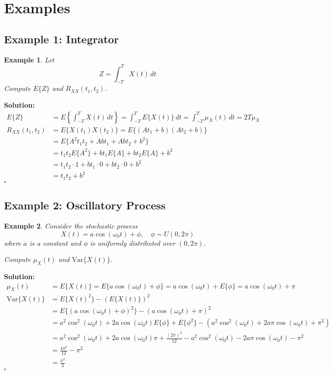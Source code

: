 \documentclass[12pt]{article}
\newtheorem{example}{Example}
\newenvironment{solution}{\noindent\textbf{Solution:}}{\hfill$\square$}
\begin{document}
\section{Examples}

\subsection{Example 1: Integrator}
\begin{example}
Let
\[
Z = \int_{-T}^{T} X(t) \, dt
\]
Compute \( E\{Z\} \) and \( R_{XX}(t_1, t_2) \).
\end{example}
\begin{solution}
\begin{align*}
E\{Z\} &= E\left\{\int_{-T}^{T} X(t) \, dt\right\} = \int_{-T}^{T} E\{X(t)\} \, dt = \int_{-T}^{T} \mu_X(t) \, dt = 2T \mu_X \\
R_{XX}(t_1, t_2) &= E\{X(t_1) X(t_2)\} = E\{(A t_1 + b)(A t_2 + b)\} \\
&= E\{A^2 t_1 t_2 + A b t_1 + A b t_2 + b^2\} \\
&= t_1 t_2 E\{A^2\} + b t_1 E\{A\} + b t_2 E\{A\} + b^2 \\
&= t_1 t_2 \cdot 1 + b t_1 \cdot 0 + b t_2 \cdot 0 + b^2 \\
&= t_1 t_2 + b^2
\end{align*}
\end{solution}

\subsection{Example 2: Oscillatory Process}
\begin{example}
Consider the stochastic process
\[
X(t) = a \cos(\omega_0 t) + \phi, \quad \phi \sim U(0, 2\pi)
\]
where \( a \) is a constant and \( \phi \) is uniformly distributed over \( (0, 2\pi) \).

Compute \( \mu_X(t) \) and \( \text{Var}\{X(t)\} \).
\end{example}
\begin{solution}
\begin{align*}
\mu_X(t) &= E\{X(t)\} = E\{a \cos(\omega_0 t) + \phi\} = a \cos(\omega_0 t) + E\{\phi\} = a \cos(\omega_0 t) + \pi \\
\text{Var}\{X(t)\} &= E\{X(t)^2\} - (E\{X(t)\})^2 \\
&= E\{(a \cos(\omega_0 t) + \phi)^2\} - (a \cos(\omega_0 t) + \pi)^2 \\
&= a^2 \cos^2(\omega_0 t) + 2a \cos(\omega_0 t) E\{\phi\} + E\{\phi^2\} - (a^2 \cos^2(\omega_0 t) + 2a \pi \cos(\omega_0 t) + \pi^2) \\
&= a^2 \cos^2(\omega_0 t) + 2a \cos(\omega_0 t) \pi + \frac{(2\pi)^2}{12} - a^2 \cos^2(\omega_0 t) - 2a \pi \cos(\omega_0 t) - \pi^2 \\
&= \frac{4\pi^2}{12} - \pi^2 \\
&= \frac{\pi^2}{3}
\end{align*}
\end{solution}
\end{document}
